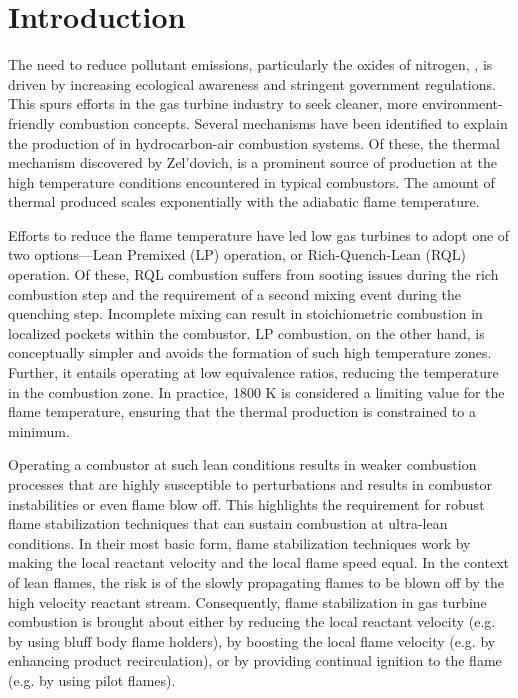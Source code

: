 \chapter{Introduction}
\label{ch:introduction}



The need to reduce pollutant emissions, particularly the oxides of nitrogen, , is driven by increasing ecological awareness and stringent government regulations.
This spurs efforts in the gas turbine industry to seek cleaner, more environment-friendly combustion concepts.
Several mechanisms have been identified to explain the production of  in hydrocarbon-air combustion systems.
Of these, the thermal  mechanism discovered by Zel'dovich, is a prominent source of  production at the high temperature conditions encountered in typical combustors.
The amount of thermal  produced scales exponentially with the adiabatic flame temperature.

Efforts to reduce the flame temperature have led low  gas turbines to adopt one of two options---Lean Premixed (LP) operation, or Rich-Quench-Lean (RQL) operation.
Of these, RQL combustion suffers from sooting issues during the rich combustion step and the requirement of a second mixing event during the quenching step.
Incomplete mixing can result in stoichiometric combustion in localized pockets within the combustor.
LP combustion, on the other hand, is conceptually simpler and avoids the formation of such high temperature zones.
Further, it entails operating at low equivalence ratios, reducing the temperature in the combustion zone.
In practice, 1800 K is considered a limiting value for the flame temperature, ensuring that the thermal  production is constrained to a minimum.

Operating a combustor at such lean conditions results in weaker combustion processes that are highly susceptible to perturbations and results in combustor instabilities or even flame blow off.
This highlights the requirement for robust flame stabilization techniques that can sustain combustion at ultra-lean conditions.
In their most basic form, flame stabilization techniques work by making the local reactant velocity and the local flame speed equal.
In the context of lean flames, the risk is of the slowly propagating flames to be blown off by the high velocity reactant stream.
Consequently, flame stabilization in gas turbine combustion is brought about either by reducing the local reactant velocity (e.g. by using bluff body flame holders), by boosting the local flame velocity (e.g. by enhancing product recirculation), or by providing continual ignition to the flame (e.g. by using pilot flames).

